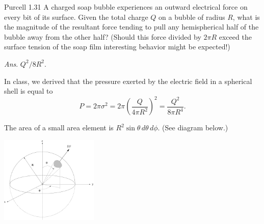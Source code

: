 \documentclass{esg8022pset}
\begin{document}
\begin{problem}{Purcell 1.31}
  A charged soap bubble experiences an outward electrical force on every bit of its surface. Given the total charge $Q$ on a bubble of radius $R$, what is the magnitude of the resultant force tending to pull any hemispherical half of the bubble away from the other half? (Should this force divided by $2\pi R$ exceed the surface tension of the soap film interesting behavior might be expected!)

  \begin{flushright}\emph{Ans}. $Q^2/8R^2$.\end{flushright}
\end{problem}
\begin{solution}
  
  In class, we derived that the pressure exerted by the electric field
  in a spherical shell is equal to
  $$P = 2\pi \sigma^2 = 2\pi \left(\frac{Q}{4\pi R^2}\right)^2 = \frac{Q^2}{8\pi R^4}.$$
  
  The area of a small area element is $R^2\sin\theta\,d\theta\,d\phi$.  (See diagram below.)
  \begin{center}\includegraphics[width=0.35\textwidth]{ps02_sol_03}\end{center}
  

\end{solution}
\end{document}
